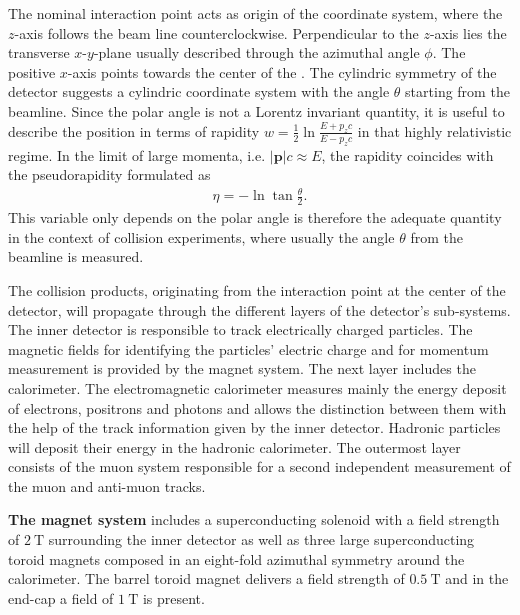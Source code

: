 %
The nominal interaction point acts as origin of the coordinate system, where the $z$-axis follows the beam line counterclockwise. Perpendicular to the $z$-axis lies the transverse $x$-$y$-plane usually described through the azimuthal angle $\phi$. The positive $x$-axis points towards the center of the {\LHC}. The cylindric symmetry of the detector suggests a cylindric coordinate system with the angle $\theta$ starting from the beamline. \cite{ATLASJINST} Since the polar angle is not a Lorentz invariant quantity, it is useful to describe the position in terms of rapidity \cite{LHCJINST} $w=\frac12\ln{\frac{E+p_zc}{E-p_zc}}$ in that highly relativistic regime. In the limit of large momenta, i.e. $|\mathbf{p}|c\approx E$, the rapidity coincides with the pseudorapidity formulated as \cite{ChinaPseudorapidityBook}
\begin{align}
                        \eta=-\ln{\tan\frac{\theta}{2}}\text{.}
\label{pseudorapidity}
\end{align}
This variable only depends on the polar angle is therefore the adequate quantity in the context of collision experiments, where usually the angle $\theta$ from the beamline is measured. \cite{ChinaPseudorapidityBook}\par
The collision products, originating from the interaction point at the center of the {\ATLAS} detector, will propagate through the different layers of the detector's sub-systems. The inner detector is responsible to track electrically charged particles. The magnetic fields for identifying the particles' electric charge and for momentum measurement is provided by the {\ATLAS} magnet system. The next layer includes the calorimeter. The electromagnetic calorimeter measures mainly the energy deposit of electrons, positrons and photons and allows the distinction between them with the help of the track information given by the inner detector. Hadronic particles will deposit their energy in the hadronic calorimeter. The outermost layer consists of the muon system responsible for a second independent measurement of the muon and anti-muon tracks. \cite{ATLASJINST}\par    
\textbf{The magnet system} includes a superconducting solenoid with a field strength of $\SI{2}{\tesla}$ surrounding the inner detector as well as three large superconducting toroid magnets composed in an eight-fold azimuthal symmetry around the calorimeter. The barrel toroid magnet delivers a field strength of $\SI{0.5}{\tesla}$ and in the end-cap a field of $\SI{1}{\tesla}$ is present. \cite{ATLASJINST}\newline%
